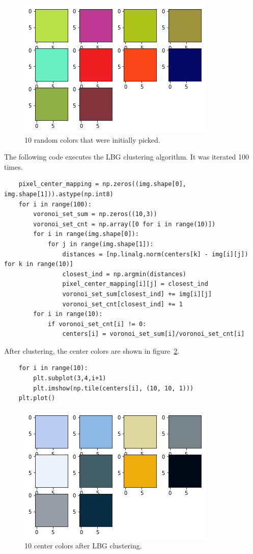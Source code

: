 \documentclass{article}
\begin{document}
\begin{figure}[h!]
\centering
\includegraphics[width=0.6\linewidth]{../images/1_random_center.png}
\caption{10 random colors that were initially picked.}
\label{fig:1_random_center}
\end{figure}

The following code executes the LBG clustering algorithm. It was iterated 100 times. 
\begin{lstlisting}
	pixel_center_mapping = np.zeros((img.shape[0], img.shape[1])).astype(np.int8)
	for i in range(100):
		voronoi_set_sum = np.zeros((10,3))
		voronoi_set_cnt = np.array([0 for i in range(10)])
		for i in range(img.shape[0]):
			for j in range(img.shape[1]):
				distances = [np.linalg.norm(centers[k] - img[i][j]) for k in range(10)]
				closest_ind = np.argmin(distances)
				pixel_center_mapping[i][j] = closest_ind
				voronoi_set_sum[closest_ind] += img[i][j]
				voronoi_set_cnt[closest_ind] += 1
		for i in range(10):
			if voronoi_set_cnt[i] != 0:
				centers[i] = voronoi_set_sum[i]/voronoi_set_cnt[i]
\end{lstlisting}
After clustering, the center colors are shown in figure~\ref{fig:1_trained_center}.
\begin{lstlisting}
	for i in range(10):
		plt.subplot(3,4,i+1)
		plt.imshow(np.tile(centers[i], (10, 10, 1)))
	plt.plot()
\end{lstlisting}

\begin{figure}[h!]
\centering
\includegraphics[width=0.6\linewidth]{../images/1_trained_center.png}
\caption{10 center colors after LBG clustering.}
\label{fig:1_trained_center}
\end{figure}
\end{document}
